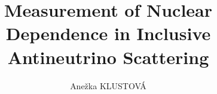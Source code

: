 \documentclass[a4paper,12pt,twoside]{report}
\begin{document}
\title{\LARGE {\bf Measurement of Nuclear Dependence in Inclusive Antineutrino Scattering}\\
 \vspace*{6mm}
}
\author{Ane\v{z}ka KLUSTOV\'{A}}

\normallinespacing
\maketitle

\preface




%
 
\renewcommand{\listfigurename}{List of figures}
\renewcommand{\listtablename}{List of tables}
\body
\pagestyle{fancy}%
\renewcommand{\chaptermark}[1]{%
\markboth{\chaptername
\ \thechapter.\ #1}{}}
\fancyhf{}%
\fancyhead[LE]{\thepage\hfill\nouppercase{\rightmark}}
\fancyhead[RO]{\nouppercase{\rightmark}\hfill\thepage}

\renewcommand{\sectionmark}[1]{\markright{\thesection.~#1}}
\renewcommand{\chaptermark}[1]{%
  \markboth{Chapter \thechapter{}: #1}{Chapter \thechapter{}: #1}%
}
\renewcommand{\headrulewidth}{0.1pt}%



\clearpage
\thispagestyle{empty}
\hfill
\clearpage



\clearpage
\thispagestyle{empty}
\hfill
\clearpage

\clearpage
\thispagestyle{empty}
\hfill
\clearpage


\clearpage
\thispagestyle{empty}
\hfill
\clearpage

\clearpage
\thispagestyle{empty}
\hfill
\clearpage

\clearpage
\thispagestyle{empty}
\hfill
\clearpage

\clearpage
\thispagestyle{empty}
\hfill
\clearpage
\end{document}
